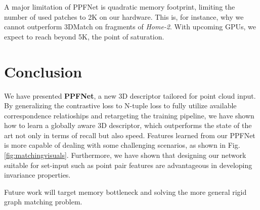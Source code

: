 \documentclass[10pt,twocolumn,letterpaper]{article}
\theoremstyle{break}
\begin{document}
\begin{table}[t!]
  \centering
  \caption{Effect of point pair features in robustness to rotations.}
    \vspace{-3mm}
  \label{tab:ppf_rotation}\end{table}A major limitation of PPFNet is quadratic memory footprint, limiting the number of used patches to 2K on our hardware. This is, for instance, why we cannot outperform 3DMatch on fragments of \textit{Home-2}. With upcoming GPUs, we expect to reach beyond 5K, the point of saturation.
\vspace{-3mm} \section{Conclusion}
\vspace{-1mm}
We have presented \textbf{PPFNet}, a new 3D descriptor tailored for point cloud input. By generalizing the contrastive loss to N-tuple loss to fully utilize available correspondence relatioships and retargeting the training pipeline, we have shown how to learn a globally aware 3D descriptor, which outperforms the state of the art not only in terms of recall but also speed. Features learned from our PPFNet is more capable of dealing with some challenging scenarios, as shown in Fig. \ref{fig:matchingvisuals}. Furthermore, we have shown that designing our network suitable for set-input such as point pair features are advantageous in developing invariance properties. 

Future work will target memory bottleneck and solving the more general rigid graph matching problem.
%
 
\clearpage

{\small


}



\setcounter{section}{0}
\renewcommand\thesection{\Alph{section}}
\newcommand{\suppsection}{\subsection}
\clearpage
\end{document}
